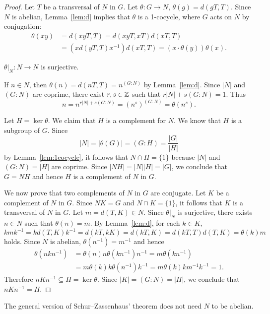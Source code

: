 \begin{proof}
	Let $T$ be a transversal of $N$ in $G$. Let $\theta\colon G\to N$,
	$\theta(g)=d(gT,T)$. Since $N$ is abelian, Lemma~\ref{lem:d} implies that 
	$\theta$ is a 1-cocycle, where $G$ acts on $N$ by conjugation: 
	\begin{align*}
		\theta(xy)&=d(xyT,T)
		=d(xyT,xT)d(xT,T)\\
		&=(xd(yT,T)x^{-1})d(xT,T)=(x\cdot\theta(y))\theta(x).
	\end{align*}

	\begin{claim}
		$\theta|_N\colon N\to N$ is surjective.
	\end{claim}

	If $n\in N$, then  
	$\theta(n)=d(nT,T)=n^{(G:N)}$ by Lemma~\ref{lem:d}. Since $|N|$ and $(G:N)$ are coprime, 
	there exist $r,s\in\mathbb{Z}$ such that $r|N|+s(G:N)=1$. Thus
	\[
		n=n^{r|N|+s(G:N)}=(n^s)^{(G:N)}=\theta(n^s).
	\]

	Let $H=\ker\theta$. We claim that $H$ is a complement for $N$. 
	We know that $H$ is a subgroup of $G$. Since 
	\[
		|N|=|\theta(G)|=(G:H)=\frac{|G|}{|H|}
	\]
	by Lemma~\ref{lem:1cocycle}, it follows that $N\cap H=\{1\}$ because 
	$|N|$ and $(G:N)=|H|$ are coprime. Since $|NH|=|N||H|=|G|$, we conclude that 
	$G=NH$ and hence $H$ is a complement of $N$ in $G$.

	We now prove that two complements of $N$ in $G$ are conjugate. Let  
	$K$ be a complement of $N$ in $G$. Since $NK=G$ and $N\cap K=\{1\}$, it follows that 
	$K$ is a transversal of $N$ in $G$. Let $m=d(T,K)\in N$. Since $\theta|_N$ is surjective, 
	there exists $n\in N$ such that $\theta(n)=m$. By 
	Lemma~\ref{lem:d}, for each $k\in K$, 
	\[
	kmk^{-1}=kd(T,K)k^{-1}=d(kT,kK)=d(kT,K)=d(kT,T)d(T,K)=\theta(k)m
	\]
	holds. Since $N$ is abelian,
	$\theta(n^{-1})=m^{-1}$ and hence  
	\begin{align*}
		\theta(nkn^{-1})&=\theta(n)n\theta(kn^{-1})n^{-1}
		=m\theta(kn^{-1})\\
		&=m\theta(k)k\theta(n^{-1})k^{-1}
		=m\theta(k)km^{-1}k^{-1}=1.
	\end{align*}
	Therefore $nKn^{-1}\subseteq H=\ker\theta$. Since
	$|K|=(G:N)=|H|$, we conclude that $nKn^{-1}=H$.
\end{proof}

The general version of 
Schur--Zassenhaus' theorem does not need $N$ to be abelian. 


